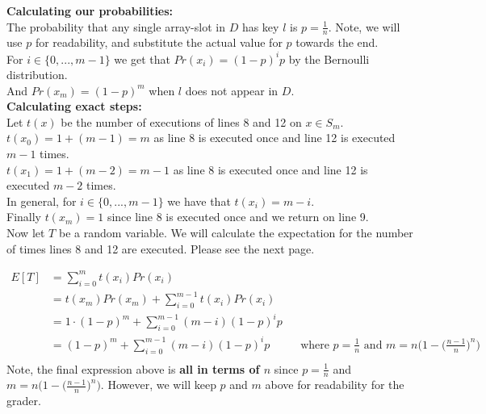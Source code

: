 \documentclass[12pt]{article}
\begin{document}
\textbf{Calculating our probabilities:} \\

The probability that any single array-slot in $D$ has key $l$ is $p = \frac{1}{n}$. Note, we will use $p$ for readability, and substitute the actual value for $p$ towards the end. \\

For $i \in \{0,...,m-1\}$ we get that $Pr(x_i) = (1-p)^ip$ by the Bernoulli distribution. \\

And $Pr(x_m) = (1-p)^m$ when $l$ does not appear in $D$. \\

\textbf{Calculating exact steps:} \\

Let $t(x)$ be the number of executions of lines 8 and 12 on $x \in S_m$. \\

$t(x_0) = 1 + (m-1) = m$ as line 8 is executed once and line 12 is executed $m-1$ times. \\

$t(x_1) = 1 + (m-2) = m - 1$ as line 8 is executed once and line 12 is executed $m-2$ times. \\

In general, for $i \in \{0,...,m-1\}$ we have that $t(x_i) = m-i$. \\

Finally $t(x_m) = 1$ since line 8 is executed once and we return on line 9. \\

Now let $T$ be a random variable. We will calculate the expectation for the number of times lines 8 and 12 are executed. Please see the next page.  

\newpage

\begin{align*}
E[T] &= \sum_{i=0}^m t(x_i)Pr(x_i) \\
&= t(x_m)Pr(x_m) + \sum_{i=0}^{m-1}t(x_i)Pr(x_i) \\
&= 1 \cdot (1-p)^m + \sum_{i=0}^{m-1} (m-i)(1-p)^ip \\
&= (1-p)^m + \sum_{i=0}^{m-1} (m-i)(1-p)^ip &&\text{where $p = \frac{1}{n}$ and $m = n \Bigg(1 - \Big(\frac{n-1}{n}\Big)^n\Bigg)$}\\
\end{align*}
Note, the final expression above is \textbf{all in terms of $n$} since $p = \frac{1}{n}$ and $m = n \Bigg(1 - \Big(\frac{n-1}{n}\Big)^n\Bigg)$. However, we will keep $p$ and $m$ above for readability for the grader. \\
\end{document}
